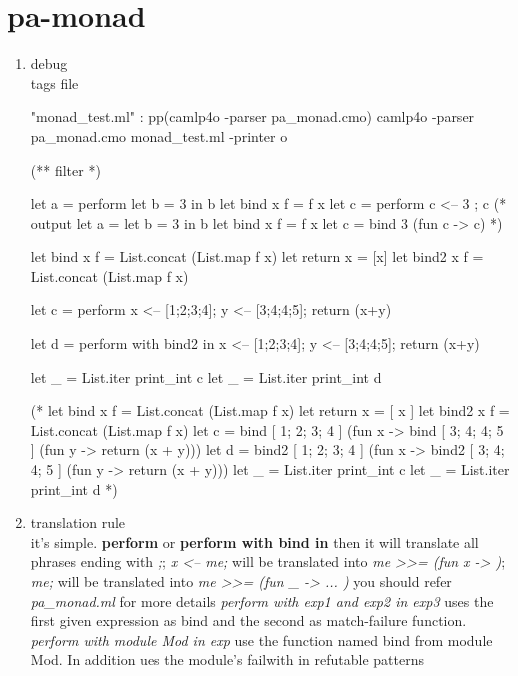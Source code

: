 \section{pa-monad}
\label{sec:pa-monad}


\begin{enumerate}
\item debug \\
  tags file
\begin{bluetext}
  "monad_test.ml" : pp(camlp4o -parser pa_monad.cmo)
  camlp4o -parser pa_monad.cmo monad_test.ml -printer o

  (** filter *)

  let a = perform let b = 3 in  b
  let bind x f = f x 
  let c = perform c <-- 3 ; c 
  (* output
  let a = let b = 3 in b
  let bind x f = f x
  let c = bind 3 (fun c -> c)
  *)



let bind x f = List.concat (List.map f x)
let return x = [x]
let bind2 x f = List.concat (List.map f x)

let c = perform 
    x <-- [1;2;3;4]; 
    y <-- [3;4;4;5]; 
    return (x+y)


let d = perform with bind2 in 
    x <-- [1;2;3;4]; 
    y <-- [3;4;4;5]; 
    return (x+y)

let _ = List.iter print_int c 
let _ = List.iter print_int d 

(*
let bind x f = List.concat (List.map f x)
let return x = [ x ]
let bind2 x f = List.concat (List.map f x)
let c =
  bind [ 1; 2; 3; 4 ]
    (fun x -> bind [ 3; 4; 4; 5 ] (fun y -> return (x + y)))
let d =
  bind2 [ 1; 2; 3; 4 ]
    (fun x -> bind2 [ 3; 4; 4; 5 ] (fun y -> return (x + y)))
let _ = List.iter print_int c
let _ = List.iter print_int d
*)  

\end{bluetext}

\item translation rule \\
  it's simple. \textbf{perform} or \textbf{perform with bind in } then
  it will translate all phrases ending with \textit{;}; \textit{x <--
 me;} will be translated into \textit{me >>= (fun x -> )};
\textit{me;} will be translated into \textit{me >>= (fun \_ -> ... )}
you should refer \textit{pa\_monad.ml} for more details 
\textit{perform with exp1 and exp2 in exp3} uses the first given
expression as bind and the second as match-failure function.
\textit{perform with module Mod in exp } use the function named bind
from module Mod. In addition ues the module's failwith in refutable patterns


\end{enumerate}
